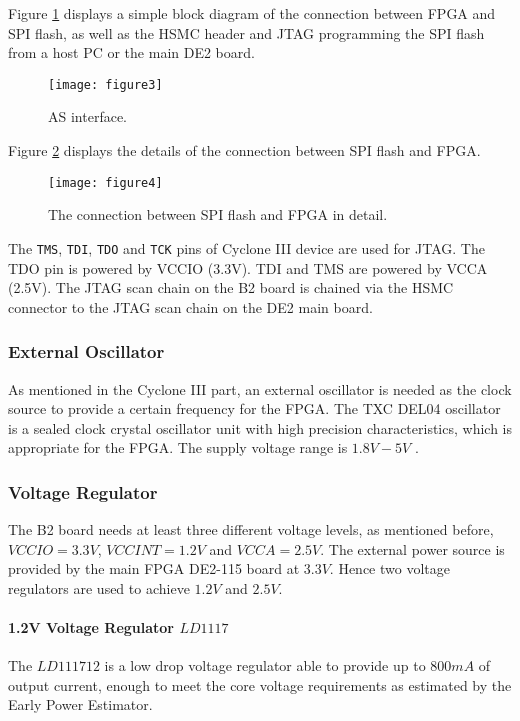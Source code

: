 Figure \ref{fig:b2_f3} displays a simple block diagram of the connection between FPGA and SPI flash,
as well as the HSMC header and JTAG programming the SPI flash from a host PC or the main DE2 board.

\begin{figure}
 \centering
 \texttt{[image: figure3]}
 \caption{AS interface.}
 \label{fig:b2_f3}
\end{figure}


Figure \ref{fig:b2_f4} displays the details of the connection between SPI flash and FPGA.

\begin{figure}
 \centering
 \texttt{[image: figure4]}
 \caption{The connection between SPI flash and FPGA in detail.}
 \label{fig:b2_f4}
\end{figure}

The \texttt{TMS}, \texttt{TDI}, \texttt{TDO} and \texttt{TCK} pins of Cyclone III device are
used for JTAG. The TDO pin is powered by VCCIO (3.3V). TDI and TMS are powered by VCCA (2.5V). The JTAG
scan chain on the B2 board is chained via the HSMC connector to the JTAG scan chain on the DE2 main board.


\subsubsection{External Oscillator}

As mentioned in the Cyclone III part, an external oscillator is needed as the clock source to provide a certain frequency for the FPGA.
The TXC DEL04 oscillator is a sealed clock crystal oscillator unit with high precision characteristics, which is appropriate for the FPGA.
The supply voltage range is $1.8V-5V$ \citep{TXC:osc_datasheet}.


\subsubsection{Voltage Regulator}
The B2 board needs at least three different voltage levels, as mentioned before, $VCCIO=3.3V$, $VCCINT= 1.2V$ and $VCCA=2.5V$.
The external power source is provided by the main FPGA DE2-115 board at $3.3V$. Hence two voltage regulators are used to achieve $1.2V$ and $2.5V$.

\paragraph{1.2V Voltage Regulator \texorpdfstring{$LD1117$}{LD1117}}
The $LD111712$ is a low drop voltage regulator able to provide up to $800mA$ of output current, enough to meet the
core voltage requirements as estimated by the Early Power Estimator.

